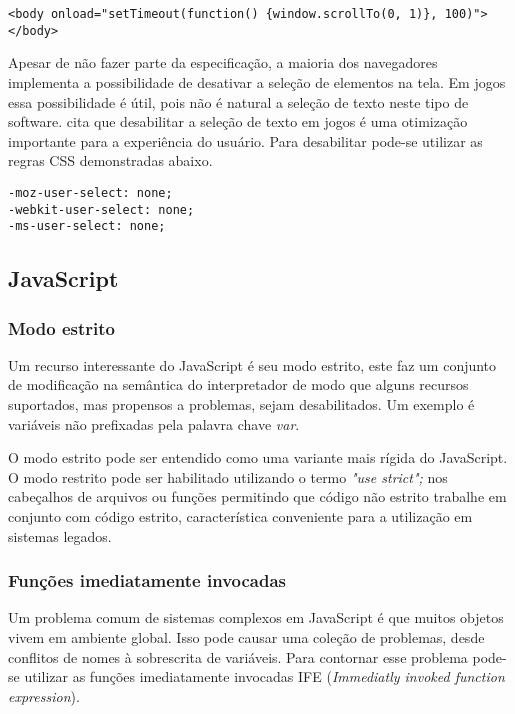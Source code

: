 \begin{verbatim}
<body onload="setTimeout(function() {window.scrollTo(0, 1)}, 100)">
</body>
\end{verbatim}

Apesar de não fazer parte da especificação, a maioria dos navegadores
implementa a possibilidade de desativar a seleção de elementos na tela.
Em jogos essa possibilidade é útil, pois não é natural a seleção de texto
neste tipo de software. \cite{html5mostwanted} cita que desabilitar
a seleção de texto em jogos é uma otimização importante para a
experiência do usuário. Para desabilitar pode-se utilizar as regras
CSS demonstradas abaixo.

\begin{verbatim}
-moz-user-select: none;
-webkit-user-select: none;
-ms-user-select: none;
\end{verbatim}

\subsection{JavaScript}

\subsubsection{Modo estrito}
Um recurso interessante do JavaScript é seu modo estrito, este faz
um conjunto de modificação na semântica do interpretador de modo
que alguns recursos suportados, mas propensos a problemas, sejam
desabilitados. Um exemplo é variáveis não prefixadas pela palavra
chave \textit{var}.

O modo estrito pode ser entendido como uma variante mais rígida
do JavaScript. O modo restrito pode ser habilitado utilizando o
termo \textit{"use strict";} nos cabeçalhos de arquivos ou funções
permitindo que código não estrito trabalhe em conjunto com código
estrito, característica conveniente para a utilização em sistemas
legados.

\subsubsection{Funções imediatamente invocadas}

Um problema comum de sistemas complexos em JavaScript é que muitos
objetos vivem em ambiente global. Isso pode causar uma coleção de
problemas, desde conflitos de nomes à sobrescrita de variáveis. Para
contornar esse problema pode-se utilizar as funções imediatamente
invocadas IFE (\textit{Immediatly invoked function expression}).

